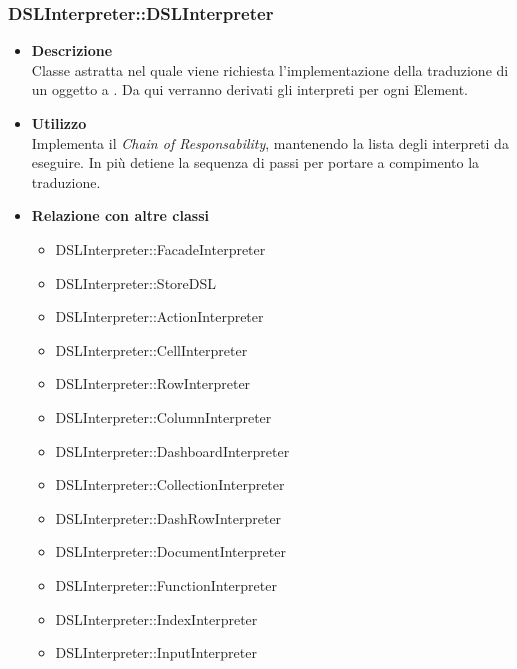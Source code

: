\subsubsection{DSLInterpreter::DSLInterpreter}
\begin{itemize}
\item \textbf{Descrizione} \hfill \\
  Classe astratta nel quale viene richiesta l'implementazione della traduzione di un oggetto a . Da qui verranno derivati gli interpreti per ogni  Element.
\item \textbf{Utilizzo} \hfill \\
  Implementa il \textit{Chain of Responsability}, mantenendo la lista degli interpreti da eseguire. In più detiene la sequenza di passi per portare a compimento la traduzione.
\item \textbf{Relazione con altre classi} \hfill
  \begin{itemize}
  \item DSLInterpreter::FacadeInterpreter
  \item DSLInterpreter::StoreDSL
  \item DSLInterpreter::ActionInterpreter
  \item DSLInterpreter::CellInterpreter
  \item DSLInterpreter::RowInterpreter
  \item DSLInterpreter::ColumnInterpreter
  \item DSLInterpreter::DashboardInterpreter
  \item DSLInterpreter::CollectionInterpreter
  \item DSLInterpreter::DashRowInterpreter
  \item DSLInterpreter::DocumentInterpreter
  \item DSLInterpreter::FunctionInterpreter
  \item DSLInterpreter::IndexInterpreter
  \item DSLInterpreter::InputInterpreter
  \end{itemize}
\end{itemize}

